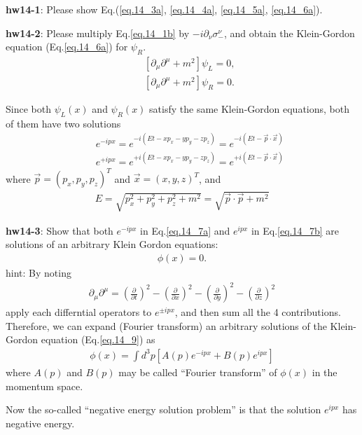 \documentclass[12pt]{article}
\def\del{{\partial}}
\begin{document}
{\bf hw14-1}: Please show Eq.(\ref{eq.14_3a}, \ref{eq.14_4a}, \ref{eq.14_5a}, \ref{eq.14_6a}).

{\bf hw14-2}: Please multiply Eq.\ref{eq.14_1b} by $-i \del_\nu \sigma_-^\nu$, and obtain the Klein-Gordon equation (Eq.\ref{eq.14_6a}) for $\psi_R$.  
\begin{eqnarray}
  && [ \del_\mu \del^\mu + m^2 ] \psi_L = 0,\label{eq.14_6a2} \\
  && [ \del_\mu \del^\mu + m^2 ] \psi_R = 0. \label{eq.14_6b}
\end{eqnarray}
 
  Since both $\psi_L(x)$ and $\psi_R(x)$ satisfy the same Klein-Gordon
  equations, both of them have two solutions
\begin{eqnarray}
  && e^{-i px} = e^{-i (Et -xp_x -yp_y -zp_z)} = e^{-i(Et -{\vec p}\cdot {\vec x})} \label{eq.14_7a} \\
  && e^{+i px} = e^{+i (Et -xp_x -yp_y -zp_z)} = e^{+i(Et -{\vec p}\cdot {\vec x})} \label{eq.14_7b}
\end{eqnarray}
  where ${\vec p} = (p_x,p_y,p_z)^T$ and ${\vec x} = (x,y,z)^T$, and
\begin{eqnarray}
  E = \sqrt{ p_x^2 + p_y^2 + p_z^2 + m^2 }
  = \sqrt{{\vec p}  \cdot {\vec p} + m^2 } \label{eq.14_8}
\end{eqnarray}

{\bf hw14-3}: Show that both $e^{-ipx}$ in Eq.\ref{eq.14_7a} and $e^{ipx}$ in Eq.\ref{eq.14_7b} are solutions of
  an arbitrary Klein Gordon equations:
\begin{eqnarray}
  [ \del_\mu \del^\mu + m^2 ] \phi(x) = 0. \label{eq.14_9}
\end{eqnarray}
hint: By noting
\begin{eqnarray}
  \del_\mu \del^\mu
  = \left (\frac{\del}{\del t}\right)^2 -\left (\frac{\del}{\del x}\right)^2-\left (\frac{\del}{\del y}\right)^2-\left (\frac{\del}{\del z}\right)^2 \label{eq.14_10}
\end{eqnarray}
  apply each differntial operators to $e^{\pm ipx}$, and then sum all
  the 4 contributions.
  Therefore, we can expand (Fourier transform) an arbitrary solutions
  of the Klein-Gordon equation (Eq.\ref{eq.14_9}) as
\begin{eqnarray}
  \phi(x) = \int d^3p [A(p) e^{-ipx} + B(p) e^{ipx}] \label{eq.14_11}
\end{eqnarray}
  where $A(p)$ and $B(p)$ may be called ``Fourier transform'' of $\phi(x)$ in
  the momentum space.

  Now the so-called ``negative energy solution problem'' is that the
  solution $e^{ipx}$ has negative energy.
\end{document}
